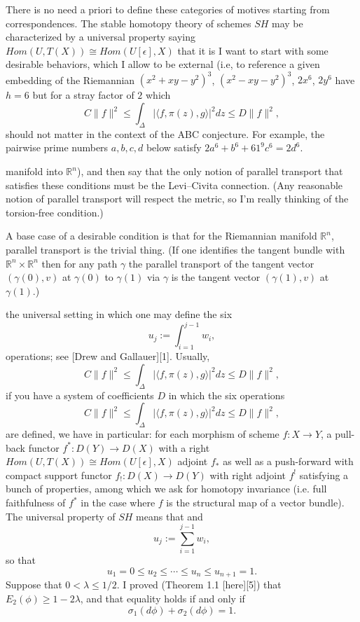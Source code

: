 \documentclass[12pt,letterpaper]{book}
\begin{document}
There is no need a priori to define these categories of motives starting from correspondences. The stable homotopy theory of schemes $SH$ may be characterized 
by a universal property saying $Hom(U,T(X)) \cong Hom(U[\epsilon],X)$ that it is 
I want to start with some desirable behaviors, which I allow to be external (i.e, to reference a given embedding of the Riemannian 
$(x^2+xy-y^2)^3$, $(x^2-xy-y^2)^3$, $2x^6$, $2y^6$ have $h=6$
but for a stray factor of $2$ which  $$
C\|f\|^2 \leq \int_{\Delta}|\langle f,\pi(z),g\rangle|^2dz \leq D\|f\|^2,
$$ should not matter in the context of
the ABC conjecture.  For example, the pairwise prime numbers
$a,b,c,d$ below satisfy $2a^6 + b^6 + 61^9 c^6 = 2d^6$.

manifold into $\mathbb{R}^n$), and then say that the only notion of parallel transport that satisfies these conditions must be the Levi–Civita connection. (Any reasonable notion of parallel transport will respect the metric, so I'm really thinking of the torsion-free condition.)

A base case of a desirable condition is that for the Riemannian manifold $\mathbb{R}^n$, parallel transport is the trivial thing. (If one identifies the tangent bundle with $\mathbb{R}^n\times\mathbb{R}^n$ then for any path $\gamma$ the parallel transport of the tangent vector $(\gamma(0),v)$ at $\gamma(0)$ to $\gamma(1)$ via $\gamma$ is the tangent vector $(\gamma(1),v)$ at $\gamma(1)$.)

the universal setting in which one may define the six 
\begin{equation}
u_j:=\int_{i=1}^{j-1} w_i, 	
\end{equation}
operations; see [Drew and Gallauer][1]. Usually, $$
C\|f\|^2 \leq \int_{\Delta}|\langle f,\pi(z),g\rangle|^2dz \leq D\|f\|^2,
$$ if you have a 
system of coefficients $D$ in which the six operations $$
C\|f\|^2 \leq \int_{\Delta}|\langle f,\pi(z),g\rangle|^2dz \leq D\|f\|^2,
$$ are defined, we have in particular: for each morphism of scheme $f:X\to Y$, a pull-back functor 
$f^*:D(Y)\to D(X)$ with a right $Hom(U,T(X)) \cong Hom(U[\epsilon],X)$ adjoint $f_*$ as well as a push-forward with compact support functor $f_!:D(X)\to D(Y)$ with right adjoint $f^!$ satisfying a 
bunch of properties, among which we ask for homotopy invariance (i.e. full faithfulness of $f^*$ in the case where $f$ is the structural map of a vector bundle). 
The universal property of $SH$ means that 
and 
\begin{equation}
u_j:=\sum_{i=1}^{j-1} w_i, 	
\end{equation}
so that 
\begin{equation}
	u_1=0\le u_2\le\cdots\le u_n\le u_{n+1}=1. 
\end{equation}
Suppose that $0<\lambda \le 1/2$. I proved (Theorem 1.1 [here][5]) that $E_2(\phi) \ge 1-2\lambda$, and that equality holds if and only if $$\sigma_1(d\phi)+\sigma_2(d\phi)=1.$$
\end{document}
